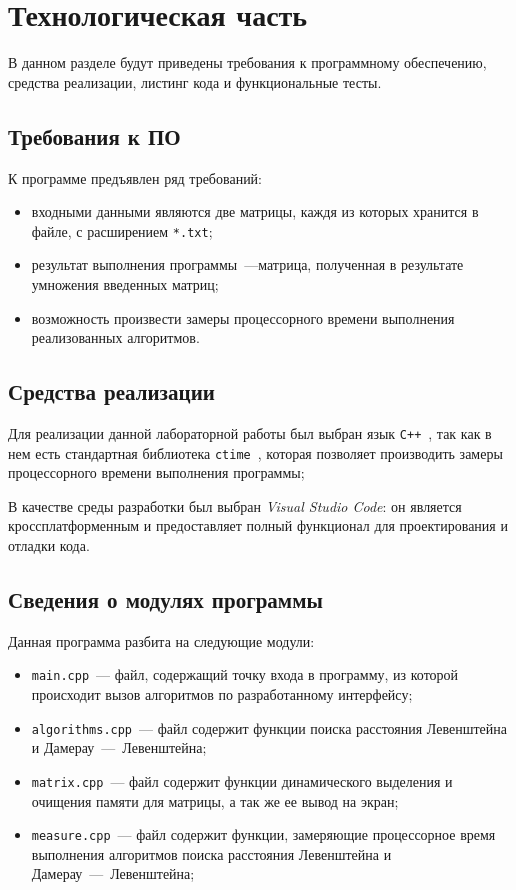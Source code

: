 \chapter{Технологическая часть}
В данном разделе будут приведены требования к программному обеспечению, средства реализации, листинг кода и функциональные тесты.

\section{Требования к ПО}
К программе предъявлен ряд требований:
\begin{itemize}
    \item входными данными являются две матрицы, каждя из которых хранится в файле, с расширением \texttt{*.txt};
    \item результат выполнения программы~---матрица, полученная в результате умножения введенных матриц;
    \item возможность произвести замеры процессорного времени выполнения реализованных алгоритмов.
\end{itemize}

\section{Средства реализации}

Для реализации данной лабораторной работы был выбран язык \texttt{C++}~\cite{cpp-lang}, так как в нем есть стандартная библиотека \texttt{ctime}~\cite{cpp-lang-time}, которая позволяет производить замеры процессорного времени выполнения программы;

В качестве среды разработки был выбран \textit{Visual Studio Code}: он является кроссплатформенным и предоставляет полный функционал для проектирования и отладки кода.
 
\section{Сведения о модулях программы}

Данная программа разбита на следующие модули:

\begin{itemize}
	\item \texttt{main.cpp}~--- файл, содержащий точку входа в программу, из которой происходит вызов алгоритмов по разработанному интерфейсу;
	\item \texttt{algorithms.cpp}~--- файл содержит функции поиска расстояния Левенштейна и Дамерау~---~Левенштейна;
	\item \texttt{matrix.cpp}~--- файл содержит функции динамического выделения и очищения памяти для матрицы, а так же ее вывод на экран;
	\item \texttt{measure.cpp}~--- файл содержит функции, замеряющие процессорное время выполнения алгоритмов поиска расстояния Левенштейна и Дамерау~---~Левенштейна;
\end{itemize}

